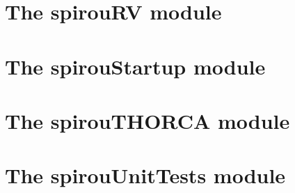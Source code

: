 \section{The spirouRV module}
\label{ch:the_module:spirouRV}


\section{The spirouStartup module}
\label{ch:the_module:spirouStartup}


\section{The spirouTHORCA module}
\label{ch:the_module:spirouTHORCA}


\section{The spirouUnitTests module}
\label{ch:the_module:spirouUnitTests}
